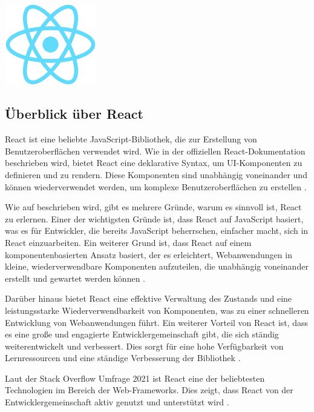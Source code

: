 \begin{center}
	\includegraphics[width=0.3\textwidth]{react-logo.png}
\end{center}

\subsection{Überblick über React}

React ist eine beliebte JavaScript-Bibliothek, die zur Erstellung von Benutzeroberflächen verwendet wird. Wie in der offiziellen React-Dokumentation beschrieben wird, bietet React eine deklarative Syntax, um UI-Komponenten zu definieren und zu rendern. Diese Komponenten sind unabhängig voneinander und können wiederverwendet werden, um komplexe Benutzeroberflächen zu erstellen \cite{react-docs}.

Wie auf \cite{makeuseof} beschrieben wird, gibt es mehrere Gründe, warum es sinnvoll ist, React zu erlernen. Einer der wichtigsten Gründe ist, dass React auf JavaScript basiert, was es für Entwickler, die bereits JavaScript beherrschen, einfacher macht, sich in React einzuarbeiten. Ein weiterer Grund ist, dass React auf einem komponentenbasierten Ansatz basiert, der es erleichtert, Webanwendungen in kleine, wiederverwendbare Komponenten aufzuteilen, die unabhängig voneinander erstellt und gewartet werden können \cite{makeuseof}.

Darüber hinaus bietet React eine effektive Verwaltung des Zustands und eine leistungsstarke Wiederverwendbarkeit von Komponenten, was zu einer schnelleren Entwicklung von Webanwendungen führt. Ein weiterer Vorteil von React ist, dass es eine große und engagierte Entwicklergemeinschaft gibt, die sich ständig weiterentwickelt und verbessert. Dies sorgt für eine hohe Verfügbarkeit von Lernressourcen und eine ständige Verbesserung der Bibliothek \cite{makeuseof}.

Laut der Stack Overflow Umfrage 2021 ist React eine der beliebtesten Technologien im Bereich der Web-Frameworks. Dies zeigt, dass React von der Entwicklergemeinschaft aktiv genutzt und unterstützt wird \cite{stackoverflow-survey}.

